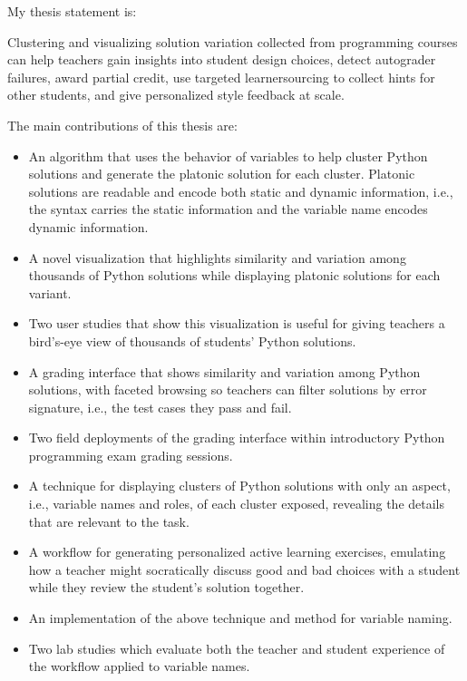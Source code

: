 \documentclass[12pt,twoside]{mitthesis}
\begin{document}
My thesis statement is: 
\begin{displayquote}
Clustering and visualizing solution variation collected from programming courses can help teachers gain insights into student design choices, detect autograder failures, award partial credit, use targeted learnersourcing to collect hints for other students, and give personalized style feedback at scale.
\end{displayquote}

The main contributions of this thesis are:
 \begin{itemize} 
\item An algorithm that uses the behavior of variables to help cluster Python solutions and generate the platonic solution for each cluster. Platonic solutions are readable and encode both static and dynamic information, i.e., the syntax carries the static information and the variable name encodes dynamic information.
\item A novel visualization that highlights similarity and variation among thousands of Python solutions while displaying platonic solutions for each variant. 
\item Two user studies that show this visualization is useful for giving teachers a bird's-eye view of thousands of students' Python solutions.
\item A grading interface that shows similarity and variation among Python solutions, with faceted browsing so teachers can filter solutions by error signature, i.e., the test cases they pass and fail. 
\item Two field deployments of the grading interface within introductory Python programming exam grading sessions.
\item A technique for displaying clusters of Python solutions with only an aspect, i.e., variable names and roles, of each cluster exposed, revealing the details that are relevant to the task. %
\item A workflow for generating personalized active learning exercises, emulating how a teacher might socratically discuss good and bad choices with a student while they review the student's solution together. 
\item An implementation of the above technique and method for variable naming. %
\item Two lab studies which evaluate both the teacher and student experience of the workflow applied to variable names.

\end{itemize}
\end{document}

